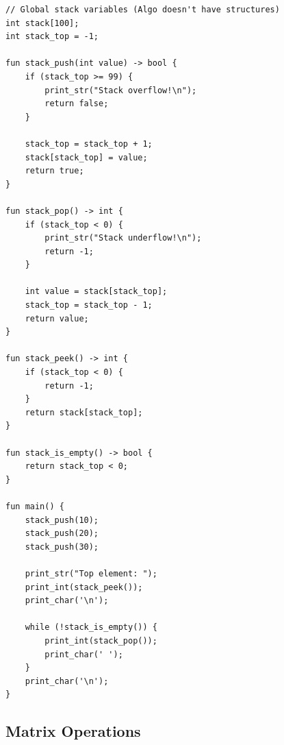 \documentclass[12pt,a4paper,oneside]{book}
\begin{document}
\begin{lstlisting}[style=algo, caption={Stack Using Arrays}]
// Global stack variables (Algo doesn't have structures)
int stack[100];
int stack_top = -1;

fun stack_push(int value) -> bool {
    if (stack_top >= 99) {
        print_str("Stack overflow!\n");
        return false;
    }
    
    stack_top = stack_top + 1;
    stack[stack_top] = value;
    return true;
}

fun stack_pop() -> int {
    if (stack_top < 0) {
        print_str("Stack underflow!\n");
        return -1;
    }
    
    int value = stack[stack_top];
    stack_top = stack_top - 1;
    return value;
}

fun stack_peek() -> int {
    if (stack_top < 0) {
        return -1;
    }
    return stack[stack_top];
}

fun stack_is_empty() -> bool {
    return stack_top < 0;
}

fun main() {
    stack_push(10);
    stack_push(20);
    stack_push(30);
    
    print_str("Top element: ");
    print_int(stack_peek());
    print_char('\n');
    
    while (!stack_is_empty()) {
        print_int(stack_pop());
        print_char(' ');
    }
    print_char('\n');
}
\end{lstlisting}

\subsection{Matrix Operations}
\end{document}
